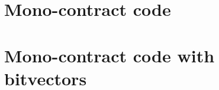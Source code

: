\documentclass{article}
\begin{document}
		

	\section{Mono-contract code}

		

	\section{Mono-contract code with bitvectors}
		\label{app:mono-contract-code-with-bitvectors}


		

	\pagebreak
\end{document}
